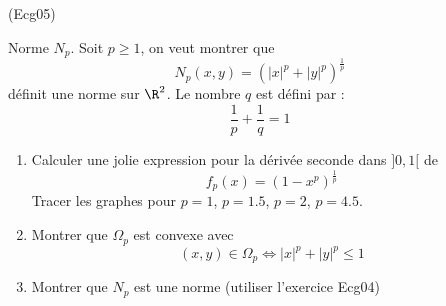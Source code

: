 \begin{tiny}(Ecg05)\end{tiny}
Norme $N_p$.\newline
Soit $p \geq 1$, on veut montrer que
\[N_p(x,y)=(|x|^p + |y|^p)^{\frac{1}{p}}\]
définit une norme sur $\R^2$. Le nombre $q$ est défini par :
\[\frac{1}{p}+\frac{1}{q}=1\]
\begin{enumerate}
\item Calculer une jolie expression pour la dérivée seconde dans $]0,1[$ de
\[f_p(x)=(1-x^p)^{\frac{1}{p}}\]
Tracer les graphes pour $p=1$, $p=1.5$, $p=2$, $p=4.5$.
\item Montrer que $\Omega_p$ est convexe avec
\[(x,y) \in \Omega_p \Leftrightarrow |x|^p+|y|^p \leq 1\]
\item Montrer que $N_p$ est une norme (utiliser l'exercice Ecg04)
\end{enumerate}